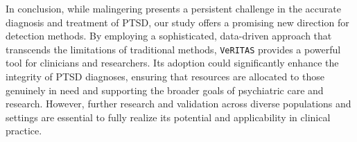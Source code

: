 \documentclass[onecolumn,10pt]{IEEEtran}
\def\vrts{\texttt{VeRITAS}\xspace}
\begin{document}
In conclusion, while malingering presents a persistent challenge in the accurate diagnosis and treatment of PTSD, our study offers a promising new direction for detection methods. By employing a sophisticated, data-driven approach that transcends the limitations of traditional methods, \vrts provides a powerful tool for clinicians and researchers. Its adoption could significantly enhance the integrity of PTSD diagnoses, ensuring that resources are allocated to those genuinely in need and supporting the broader goals of psychiatric care and research. However, further research and validation across diverse populations and settings are essential to fully realize its potential and applicability in clinical practice.







\end{document}

